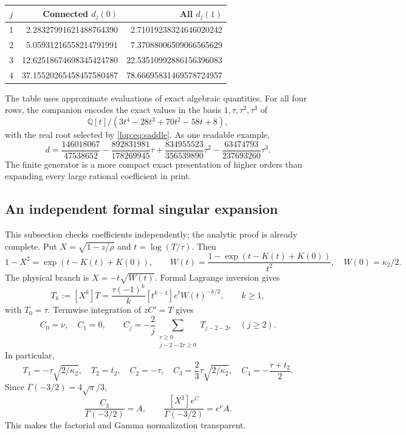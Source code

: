 \documentclass[11pt,letterpaper]{article}
\numberwithin{equation}{section}
\theoremstyle{remark}\newtheorem{remark}[theorem]{Remark}
\newcommand{\QQ}{\mathbb Q}
\begin{document}
\begin{center}
\begin{tabular}{crr}
\toprule
$j$&Connected $d_j(0)$&All $d_j(1)$\\
\midrule
1&2.28327991621488764390&2.71019238324646020242\\
2&5.05931216558214791991&7.37088006509066565629\\
3&12.62518674698345424780&22.53510992886156396083\\
4&37.15520265458457580487&78.66695831469578724957\\
\bottomrule
\end{tabular}
\end{center}
The table uses approximate evaluations of exact algebraic quantities.
For all four rows, the companion encodes the exact values in the basis
$1,\tau,\tau^2,\tau^3$ of
\[
 \QQ[t]/(3t^4-28t^3+70t^2-58t+8),
\]
with the real root selected by \eqref{lop:eq:saddle}. As one readable example,
\begin{equation}\label{lop:eq:fieldd}
 d=\frac{146018067}{47538652}
 -\frac{892831981}{178269945}\tau
 +\frac{834955523}{356539890}\tau^2
 -\frac{63474793}{237693260}\tau^3.
\end{equation}
The finite generator is a more compact exact presentation of higher
orders than expanding every large rational coefficient in print.

\subsection{An independent formal singular expansion}\label{lop:sec:formal}
This subsection checks coefficients independently; the analytic proof
is already complete. Put $X=\sqrt{1-z/\rho}$ and
$t=\log(T/\tau)$. Then
\[
 1-X^2=\exp(t-K(t)+K(0)),\qquad
 W(t)=\frac{1-\exp(t-K(t)+K(0))}{t^2},\quad W(0)=\kappa_2/2.
\]
The physical branch is $X=-t\sqrt{W(t)}$. Formal Lagrange inversion gives
\begin{equation}\label{lop:eq:formalT}
 T_k:=[X^k]T
 =\frac{\tau(-1)^k}{k}[t^{k-1}]e^tW(t)^{-k/2},\qquad k\geq1,
\end{equation}
with $T_0=\tau$. Termwise integration of $zC'=T$ gives
\begin{equation}\label{lop:eq:formalC}
 C_0=\nu,\quad C_1=0,\qquad
 C_j=-\frac2j\sum_{\substack{r\geq0\\j-2-2r\geq0}}T_{j-2-2r}
 \quad(j\geq2).
\end{equation}
In particular,
\[
 T_1=-\tau\sqrt{2/\kappa_2},\quad T_2=t_2,\quad C_2=-\tau,
 \quad C_3=\frac23\tau\sqrt{2/\kappa_2},\quad C_4=-\frac{\tau+t_2}{2}.
\]
Since $\Gamma(-3/2)=4\sqrt\pi/3$,
\begin{equation}\label{lop:eq:normalization}
 \frac{C_3}{\Gamma(-3/2)}=A,\qquad
 \frac{[X^3]e^{C}}{\Gamma(-3/2)}=e^\nu A.
\end{equation}
This makes the factorial and Gamma normalization transparent.
\end{document}
